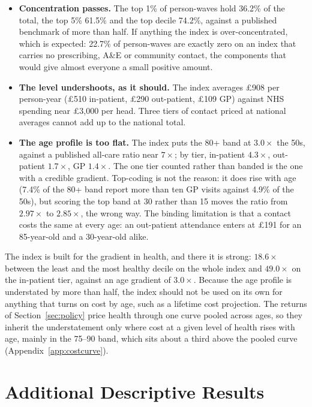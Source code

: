 \documentclass[11pt]{article}
\begin{document}
	\begin{itemize}
		\item \textbf{Concentration passes.} The top 1\% of person-waves hold 36.2\% of the total, the top 5\% 61.5\% and the top decile 74.2\%, against a published benchmark of more than half. If anything the index is over-concentrated, which is expected: 22.7\% of person-waves are exactly zero on an index that carries no prescribing, A\&E or community contact, the components that would give almost everyone a small positive amount.
		\item \textbf{The level undershoots, as it should.} The index averages \pounds908 per person-year (\pounds510 in-patient, \pounds290 out-patient, \pounds109 GP) against NHS spending near \pounds3{,}000 per head. Three tiers of contact priced at national averages cannot add up to the national total.
		\item \textbf{The age profile is too flat.} The index puts the 80+ band at $3.0\times$ the 50s, against a published all-care ratio near $7\times$; by tier, in-patient $4.3\times$, out-patient $1.7\times$, GP $1.4\times$. The one tier counted rather than banded is the one with a credible gradient. Top-coding is not the reason: it does rise with age (7.4\% of the 80+ band report more than ten GP visits against 4.9\% of the 50s), but scoring the top band at 30 rather than 15 moves the ratio from $2.97\times$ to $2.85\times$, the wrong way. The binding limitation is that a contact costs the same at every age: an out-patient attendance enters at \pounds191 for an 85-year-old and a 30-year-old alike.
	\end{itemize}

	The index is built for the gradient in health, and there it is strong: $18.6\times$ between the least and the most healthy decile on the whole index and $49.0\times$ on the in-patient tier, against an age gradient of $3.0\times$. Because the age profile is understated by more than half, the index should not be used on its own for anything that turns on cost by age, such as a lifetime cost projection. The returns of Section~\ref{sec:policy} price health through one curve pooled across ages, so they inherit the understatement only where cost at a given level of health rises with age, mainly in the 75--90 band, which sits about a third above the pooled curve (Appendix~\ref{app:costcurve}).


	\section{Additional Descriptive Results} \label{app:descriptive}
\end{document}
